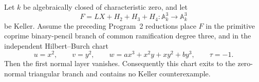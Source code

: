 
\begin{theorem}[Primitive $\tau=-1$ chart]
\label{thm:quartic-r3-tau-minus-one}
Let $k$ be algebraically closed of characteristic zero, and let
\[
 F=LX+H_2+H_3+H_4:\mathbb A_k^3\longrightarrow\mathbb A_k^3
\]
be Keller.  Assume the preceding Program~2 reductions place $F$ in the
primitive coprime binary-pencil branch of common ramification degree three,
and in the independent Hilbert--Burch chart
\[
 u=x^2,\qquad v=y^2,\qquad
 w=ax^3+x^2y+xy^2+by^3,\qquad \tau=-1.
\]
Then the first normal layer vanishes.  Consequently this chart exits to the
zero-normal triangular branch and contains no Keller counterexample.
\end{theorem}

